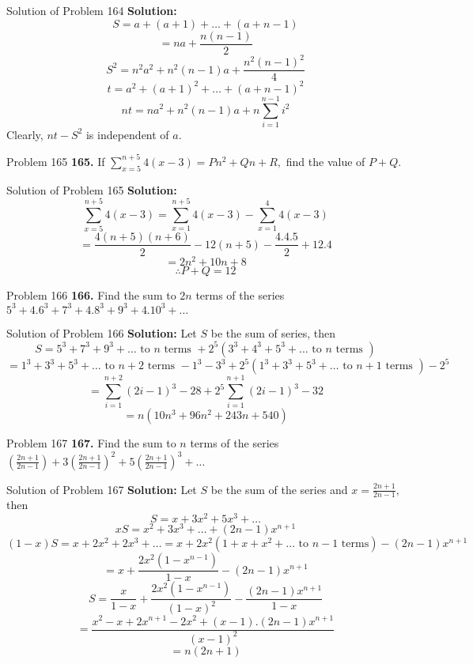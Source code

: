 \documentclass[aspectratio=1610,8pt]{beamer}
\begin{document}
\begin{frame}{Solution of Problem 164}
  \textbf{Solution:} $$S = a + (a + 1) + \ldots + (a + n - 1)$$
  $$= na + \frac{n(n - 1)}{2}$$
  $$S^2 = n^2a^2 + n^2(n - 1)a + \frac{n^2(n - 1)^2}{4}$$
  $$t = a^2 + (a + 1)^2 + \ldots + (a + n - 1)^2$$
  $$nt = na^2 + n^2(n - 1)a + n\sum_{i = 1}^{n - 1}i^2$$
  Clearly, $nt - S^2$ is independent of $a.$
\end{frame}
\begin{frame}{Problem 165}
  \textbf{165.} If $\sum_{x = 5}^{n + 5}4(x - 3) = Pn^2 + Qn + R,$ find the value of $P + Q.$
\end{frame}
\begin{frame}{Solution of Problem 165}
  \textbf{Solution:} $$\sum_{x = 5}^{n + 5}4(x - 3) = \sum_{x = 1}^{n + 5}4(x - 3) - \sum_{x = 1}^{4}4(x - 3)$$
  $$= \frac{4(n + 5)(n + 6)}{2} - 12(n + 5) - \frac{4.4.5}{2} + 12.4$$
  $$= 2n^2 + 10n + 8$$
  $$\therefore P + Q = 12$$
\end{frame}
\begin{frame}{Problem 166}
  \textbf{166.} Find the sum to $2n$ terms of the series $5^3 + 4.6^3 + 7^3 + 4.8^3 + 9^3 + 4.10^3 + \ldots$
\end{frame}
\begin{frame}{Solution of Problem 166}
  \textbf{Solution:} Let $S$ be the sum of series, then
  $$S = 5^3 + 7^3 + 9^3 + \ldots \text{~to~}n\text{~terms~} + 2^5(3^3 + 4^3 + 5^3 + \ldots \text{~to~}n\text{~terms~})$$
  $$= 1^3 + 3^3 + 5^3 + \ldots \text{~to~}n + 2\text{~terms~} - 1^3 - 3^3 + 2^5(1^3 + 3^3 + 5^3 + \ldots \text{~to~}n +
  1\text{~terms~}) - 2^5$$
  $$= \sum_{i = 1}^{n + 2}(2i - 1)^3 - 28 + 2^5\sum_{i = 1}^{n + 1}(2i - 1)^3 - 32$$
  $$= n(10n^3 + 96n^2 + 243n + 540)$$
\end{frame}
\begin{frame}{Problem 167}
  \textbf{167.} Find the sum to $n$ terms of the series $\left(\frac{2n + 1}{2n - 1}\right) + 3\left(\frac{2n + 1}{2n - 1}\right)^2
  + 5\left(\frac{2n + 1}{2n - 1}\right)^3 + \ldots$
\end{frame}
\begin{frame}{Solution of Problem 167}
  \textbf{Solution:} Let $S$ be the sum of the series and $x = \frac{2n + 1}{2n - 1},$ then
  $$S = x + 3x^2 + 5x^3 + \ldots$$
  $$xS = x^2 + 3x^3 + \ldots + (2n - 1)x^{n + 1}$$
  $$(1 - x)S = x + 2x^2 + 2x^3 + \ldots = x + 2x^2(1 + x + x^2 + \ldots \text{~to~}n - 1\text{~terms}) -(2n - 1)x^{n+1}$$
  $$= x + \frac{2x^2(1 - x^{n - 1})}{1 - x} - (2n - 1)x^{n+1}$$
  $$S = \frac{x}{1 - x} + \frac{2x^2(1 - x^{n - 1})}{(1 - x)^2} - \frac{(2n - 1)x^{n+1}}{1 - x}$$
  $$= \frac{x^2 - x + 2x^{n + 1} - 2x^2 + (x - 1).(2n - 1)x^{n + 1}}{(x - 1)^2}$$
  $$= n(2n + 1)$$
\end{frame}
\end{document}
